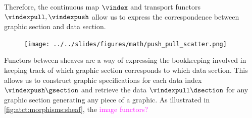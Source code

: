 \documentclass[10pt,journal,compsoc]{IEEEtran}
\newcommand{\note}[1]{\textcolor{magenta}{#1}}
\theoremstyle{definition}
\theoremstyle{remark}
\begin{document}
Therefore, the continuous map $\vindex$ and transport functors $\vindexpull, \vindexpush$ allow us to express the correspondence between graphic section and data section. 

\begin{figure}[ht]
  \label{fig:atct:morphisms:sheaf}
  \texttt{[image: ../../slides/figures/math/push\_pull\_scatter.png]}
  \caption{}
\end{figure}

Functors between sheaves are a way of expressing the bookkeeping involved in keeping track of which graphic section corresponds to which data section. This allows us to construct graphic specifications for each data index $\vindexpush\gsection$ and retrieve the data $\vindexpull\dsection$ for any graphic section generating any piece of a graphic. As illustrated in \autoref{fig:atct:morphisms:sheaf}, the \note{image functors?}
\end{document}
